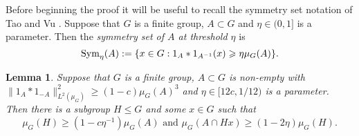 \documentclass[12pt]{amsart}
\numberwithin{equation}{section}
\theoremstyle{plain}
\newtheorem{lemma}[subsection]{Lemma}
\theoremstyle{definition}
\renewcommand{\leq}{\leqslant}
\renewcommand{\geq}{\geqslant}
\providecommand{\Sym}{\mathop{\rm Sym}\nolimits}
\begin{document}
Before beginning the proof it will be useful to recall the symmetry set notation of Tao and Vu \cite{TCTVHV}.  Suppose that $G$ is a finite group, $A \subset G$ and $\eta \in (0,1]$ is a parameter. Then the \emph{symmetry set of $A$ at threshold $\eta$} is 
\begin{equation*}
\Sym_{\eta}(A):=\{x \in G: 1_A \ast 1_{A^{-1}}(x) \geq \eta\mu_G(A)\}.
\end{equation*}
\begin{lemma}\label{lem.fourn}
Suppose that $G$ is a finite group, $A \subset G$ is non-empty with $\|1_A\ast 1_{-A}\|_{L^2(\mu_G)}^2 \geq (1-c)\mu_G(A)^3$ and $\eta \in [12c,1/12)$ is a parameter.  Then there is a subgroup $H \leq G$ and some $x \in G$ such that
\begin{equation*}
\mu_G(H) \geq (1-c\eta^{-1})\mu_G(A) \textrm{ and } \mu_G(A \cap Hx) \geq (1-2\eta)\mu_G(H).
\end{equation*}
\end{lemma}
\end{document}
